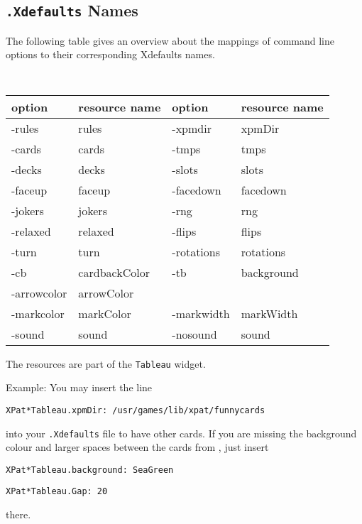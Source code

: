 \subsection{{\tt .Xdefaults} Names}
The following table gives an overview about the mappings of command line
options to their corresponding Xdefaults names.
\begin{center}
{\tt
\begin{tabular}{|l|l||l|l|}
\hline
  {\rm option} & {\rm resource name} & {\rm option} & {\rm resource name}\\
\hline
    -rules &     rules &
    -xpmdir &    xpmDir\\
    -cards &     cards&
    -tmps  &     tmps\\
    -decks &     decks&       
    -slots &     slots\\
    -faceup &    faceup&     
    -facedown &  facedown\\
    -jokers &    jokers&
    -rng &rng\\
    -relaxed  &  relaxed&
    -flips    &  flips\\
    -turn     &  turn&
    -rotations&  rotations\\
    -cb &        cardbackColor&
    -tb &        background\\   
    -arrowcolor &arrowColor         &&\\
    -markcolor & markColor& 
    -markwidth & markWidth\\ 
    -sound &     sound&
    -nosound &   sound\\
\hline
\end{tabular}
}
\end{center}
The resources are part of the {\tt Tableau} widget.

\medskip\noindent
Example: You may insert the line

  {\tt XPat*Tableau.xpmDir: /usr/games/lib/xpat/funnycards}

\noindent
into your {\tt .Xdefaults} file to have other cards. If you are missing the
background colour and larger spaces between the cards from \spider, just insert 

  {\tt XPat*Tableau.background: SeaGreen}

  {\tt XPat*Tableau.Gap: 20}

\noindent
there.

